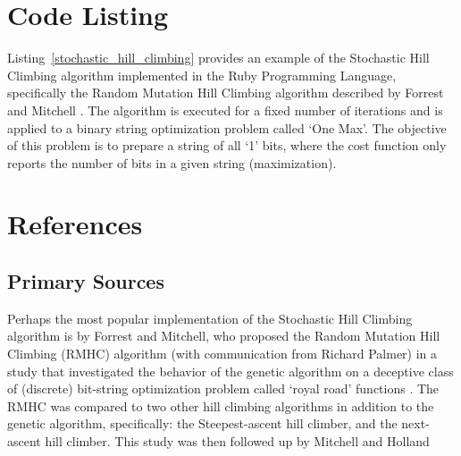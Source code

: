 \documentclass[a4paper, 11pt]{article}
\begin{document}
\section{Code Listing}
\label{sec:code}
Listing~\ref{stochastic_hill_climbing} provides an example of the Stochastic Hill Climbing algorithm implemented in the Ruby Programming Language, specifically the Random Mutation Hill Climbing algorithm described by Forrest and Mitchell \cite{Forrest1993}.
The algorithm is executed for a fixed number of iterations and is applied to a binary string optimization problem called `One Max'. The objective of this problem is to prepare a string of all `1' bits, where the cost function only reports the number of bits in a given string (maximization).



\section{References}
\label{sec:references}

% 
% 
\subsection{Primary Sources}
Perhaps the most popular implementation of the Stochastic Hill Climbing algorithm is by Forrest and Mitchell, who proposed the Random Mutation Hill Climbing (RMHC) algorithm (with communication from Richard Palmer) in a study that investigated the behavior of the genetic algorithm on a deceptive class of (discrete) bit-string optimization problem called `royal road' functions \cite{Forrest1993}. The RMHC was compared to two other hill climbing algorithms in addition to the genetic algorithm, specifically: the Steepest-ascent hill climber, and the next-ascent hill climber. This study was then followed up by Mitchell and Holland \cite{Mitchell1993}
\end{document}
